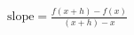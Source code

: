 \documentclass[preview]{standalone}
\begin{document}
\begin{align*}
\text{slope} = \frac{f(x+h) - f(x)}{(x+h) - x}
\end{align*}
\end{document}
